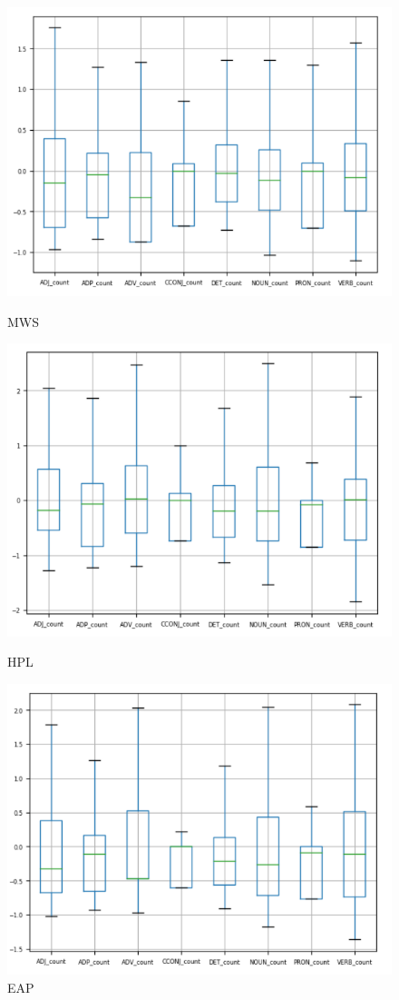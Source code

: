\documentclass[8pt]{article}
\begin{document}
\vskip 0.2in
\begin{figure}[h]
  \begin{multicols}{3}
      \includegraphics[width=\linewidth]{images/tag_mws.png}\par\caption{MWS}
      \includegraphics[width=\linewidth]{images/tag_hpl.png}\par\caption{HPL}
      \includegraphics[width=\linewidth]{images/tag_eap.png}\par\caption{EAP}

\end{multicols}
\end{figure}
\end{document}
